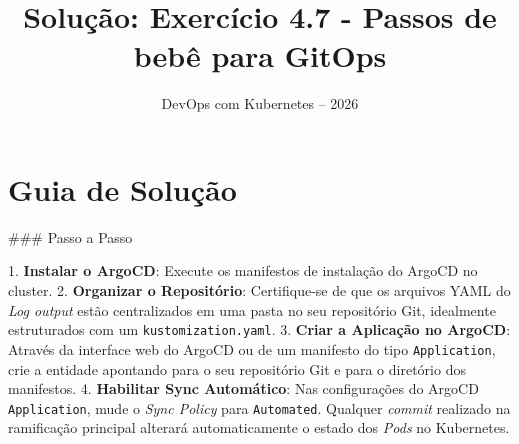 \documentclass[11pt,a4paper]{article}
\title{\color{secondary}\Huge\textbf{Solução: Exercício 4.7 - Passos de bebê para GitOps}}
\author{\color{primary}DevOps com Kubernetes -- 2026}
\date{}
\begin{document}
\maketitle

\section*{\color{primary}Guia de Solução}
\begin{tcolorbox}[colback=green!5!white,colframe=green!60!black,title=Resolução Passo a Passo]
### Passo a Passo

1. \textbf{Instalar o ArgoCD}: Execute os manifestos de instalação do ArgoCD no cluster.
2. \textbf{Organizar o Repositório}: Certifique-se de que os arquivos YAML do \textit{Log output} estão centralizados em uma pasta no seu repositório Git, idealmente estruturados com um \texttt{kustomization.yaml}.
3. \textbf{Criar a Aplicação no ArgoCD}: Através da interface web do ArgoCD ou de um manifesto do tipo \texttt{Application}, crie a entidade apontando para o seu repositório Git e para o diretório dos manifestos.
4. \textbf{Habilitar Sync Automático}: Nas configurações do ArgoCD \texttt{Application}, mude o \textit{Sync Policy} para \texttt{Automated}. Qualquer \textit{commit} realizado na ramificação principal alterará automaticamente o estado dos \textit{Pods} no Kubernetes.
\end{tcolorbox}
\end{document}
